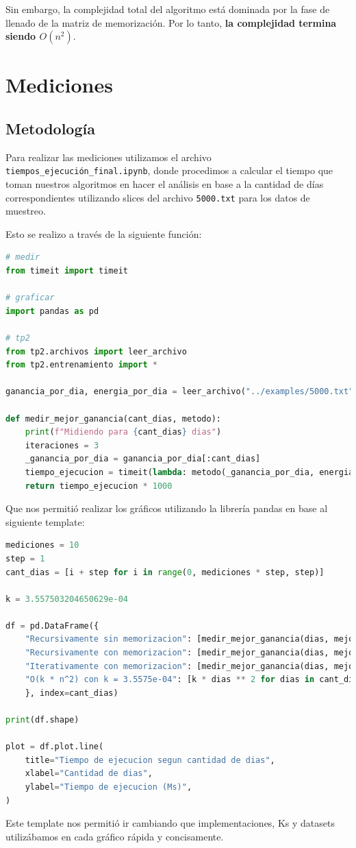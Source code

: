 \documentclass{estilo}
\begin{document}
Sin embargo, la complejidad total del algoritmo está dominada por la fase de llenado de la matriz de memorización. Por lo tanto, \textbf{la complejidad termina siendo $O(n^2)$}.

\newpage

\section{Mediciones}
\subsection{Metodología}

Para realizar las mediciones utilizamos el archivo \texttt{tiempos\_ejecución\_final.ipynb}, donde procedimos a calcular el tiempo que toman nuestros algoritmos en hacer el análisis en base a la cantidad de días correspondientes utilizando slices del archivo \texttt{5000.txt} para los datos de muestreo. 

Esto se realizo a través de la siguiente función:
\begin{lstlisting}[language=Python]
# medir
from timeit import timeit

# graficar
import pandas as pd

# tp2
from tp2.archivos import leer_archivo
from tp2.entrenamiento import *

ganancia_por_dia, energia_por_dia = leer_archivo("../examples/5000.txt")

def medir_mejor_ganancia(cant_dias, metodo):
    print(f"Midiendo para {cant_dias} dias")
    iteraciones = 3
    _ganancia_por_dia = ganancia_por_dia[:cant_dias]
    tiempo_ejecucion = timeit(lambda: metodo(_ganancia_por_dia, energia_por_dia), number=iteraciones) / iteraciones
    return tiempo_ejecucion * 1000
\end{lstlisting}

Que nos permitió realizar los gráficos utilizando la librería pandas en base al siguiente template:
\begin{lstlisting}[language=Python]
mediciones = 10
step = 1
cant_dias = [i + step for i in range(0, mediciones * step, step)]

k = 3.557503204650629e-04

df = pd.DataFrame({
    "Recursivamente sin memorizacion": [medir_mejor_ganancia(dias, mejor_ganancia_recursivo) for dias in cant_dias],
    "Recursivamente con memorizacion": [medir_mejor_ganancia(dias, mejor_ganancia_recursivo_con_memoria) for dias in cant_dias],
    "Iterativamente con memorizacion": [medir_mejor_ganancia(dias, mejor_ganancia_iterativo) for dias in cant_dias],
    "O(k * n^2) con k = 3.5575e-04": [k * dias ** 2 for dias in cant_dias]
    }, index=cant_dias)

print(df.shape)

plot = df.plot.line(
    title="Tiempo de ejecucion segun cantidad de dias",
    xlabel="Cantidad de dias",
    ylabel="Tiempo de ejecucion (Ms)",
)
\end{lstlisting}
Este template nos permitió ir cambiando que implementaciones, Ks y datasets utilizábamos en cada gráfico rápida y concisamente.
\newpage
\end{document}
